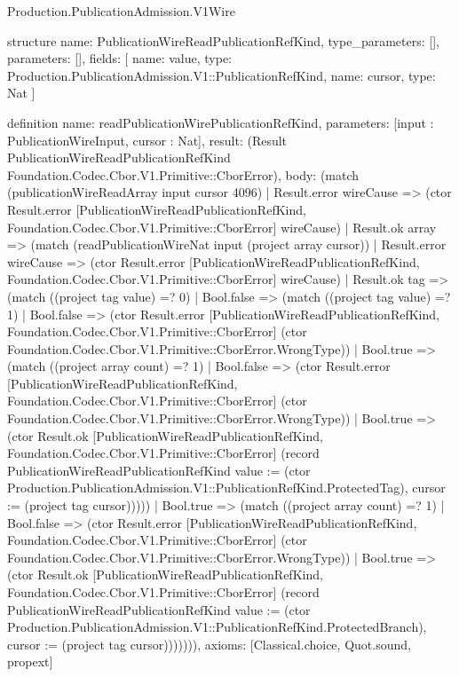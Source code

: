 \begin{lexlean}{Production.PublicationAdmission.V1Wire}
\begin{semanticmodule}
structure{
  name: PublicationWireReadPublicationRefKind,
  type_parameters: [],
  parameters: [],
  fields: [
    {name: value, type: Production.PublicationAdmission.V1::PublicationRefKind},
    {name: cursor, type: Nat}
  ]
}

definition{
  name: readPublicationWirePublicationRefKind,
  parameters: [input : PublicationWireInput, cursor : Nat],
  result: (Result PublicationWireReadPublicationRefKind Foundation.Codec.Cbor.V1.Primitive::CborError),
  body: (match (publicationWireReadArray input cursor 4096)
    | Result.error wireCause => (ctor Result.error [PublicationWireReadPublicationRefKind, Foundation.Codec.Cbor.V1.Primitive::CborError] wireCause)
    | Result.ok array => (match (readPublicationWireNat input (project array cursor))
      | Result.error wireCause => (ctor Result.error [PublicationWireReadPublicationRefKind, Foundation.Codec.Cbor.V1.Primitive::CborError] wireCause)
      | Result.ok tag => (match ((project tag value) =? 0)
        | Bool.false => (match ((project tag value) =? 1)
          | Bool.false => (ctor Result.error [PublicationWireReadPublicationRefKind, Foundation.Codec.Cbor.V1.Primitive::CborError] (ctor Foundation.Codec.Cbor.V1.Primitive::CborError.WrongType))
          | Bool.true => (match ((project array count) =? 1)
            | Bool.false => (ctor Result.error [PublicationWireReadPublicationRefKind, Foundation.Codec.Cbor.V1.Primitive::CborError] (ctor Foundation.Codec.Cbor.V1.Primitive::CborError.WrongType))
            | Bool.true => (ctor Result.ok [PublicationWireReadPublicationRefKind, Foundation.Codec.Cbor.V1.Primitive::CborError] (record PublicationWireReadPublicationRefKind {value := (ctor Production.PublicationAdmission.V1::PublicationRefKind.ProtectedTag), cursor := (project tag cursor)}))))
        | Bool.true => (match ((project array count) =? 1)
          | Bool.false => (ctor Result.error [PublicationWireReadPublicationRefKind, Foundation.Codec.Cbor.V1.Primitive::CborError] (ctor Foundation.Codec.Cbor.V1.Primitive::CborError.WrongType))
          | Bool.true => (ctor Result.ok [PublicationWireReadPublicationRefKind, Foundation.Codec.Cbor.V1.Primitive::CborError] (record PublicationWireReadPublicationRefKind {value := (ctor Production.PublicationAdmission.V1::PublicationRefKind.ProtectedBranch), cursor := (project tag cursor)})))))),
  axioms: [Classical.choice, Quot.sound, propext]
}


\end{semanticmodule}
\end{lexlean}
